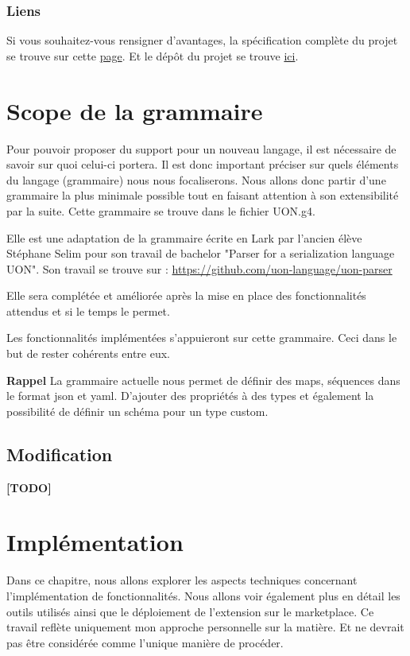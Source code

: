 \documentclass[
    iict, %
    il, %
]{heig-tb}
\begin{document}
\subsection{Liens}
Si vous souhaitez-vous rensigner d'avantages, la spécification complète du projet se trouve sur cette \href{https://github.com/uon-language/specification/}{page}.
Et le dépôt du projet se trouve \href{https://github.com/uon-language/specification}{ici}.

\chapter{Scope de la grammaire}\label{grammar scope}
Pour pouvoir proposer du support pour un nouveau langage, il est nécessaire de savoir sur quoi celui-ci portera. Il est donc important préciser sur quels éléments du langage (grammaire) nous nous focaliserons.
Nous allons donc partir d'une grammaire la plus minimale possible tout en faisant attention à son extensibilité par la suite.
Cette grammaire se trouve dans le fichier UON.g4.

Elle est une adaptation de la grammaire écrite en Lark par l'ancien élève Stéphane Selim pour son travail de bachelor "Parser for a serialization language UON". Son travail se trouve sur :
\href{https://github.com/uon-language/uon-parser}{https://github.com/uon-language/uon-parser}

Elle sera complétée et améliorée après la mise en place des fonctionnalités attendus et si le temps le permet.

Les fonctionnalités implémentées s'appuieront sur cette grammaire. Ceci dans le but de rester cohérents entre eux.

\textbf{Rappel}
La grammaire actuelle nous permet de définir des maps, séquences dans le format json et yaml. D'ajouter des propriétés à des types et également la possibilité de définir un schéma pour un type custom.

\section{Modification}
\textbf{[TODO]}
\cite{test}

\chapter{Implémentation}
Dans ce chapitre, nous allons explorer les aspects techniques concernant l'implémentation de fonctionnalités. Nous allons voir également plus en détail les outils utilisés ainsi que le déploiement de l'extension sur le marketplace.
Ce travail reflète uniquement mon approche personnelle sur la matière. Et ne devrait pas être considérée comme l'unique manière de procéder.
\end{document}
